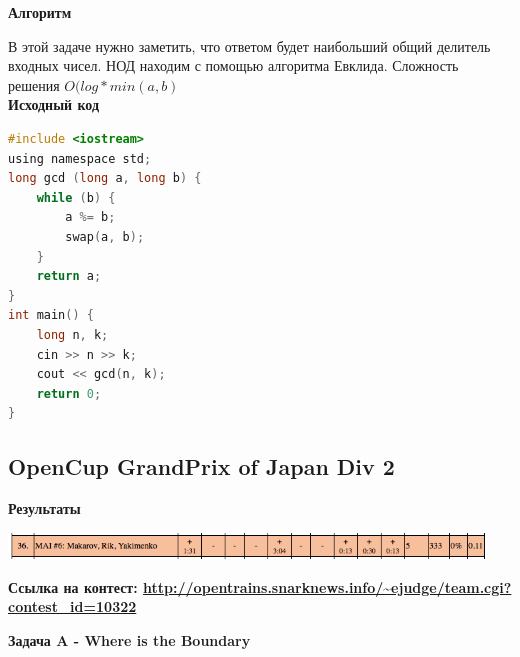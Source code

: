 \documentclass[a4paper,12pt]{article}
\begin{document}
\textbf{{\large Алгоритм}}

В этой задаче нужно заметить, что ответом будет наибольший общий делитель входных чисел. НОД находим с помощью алгоритма Евклида. Сложность решения $O(log * min(a, b)$ \\


\textbf{{\large Исходный код}} \\
\begin{lstlisting}[language=C]
#include <iostream>
using namespace std;
long gcd (long a, long b) {
    while (b) {
        a %= b;
        swap(a, b);
    }
    return a;
}
int main() {
    long n, k;
    cin >> n >> k;
    cout << gcd(n, k);
    return 0;
}
\end{lstlisting}






%
%
\newpage
\subsection{OpenCup GrandPrix of Japan Div 2}

\textbf{{\large Результаты}} \\
\begin{center}
\includegraphics[width=0.95\textwidth]{OC_Japan/result.png}\\ [1cm]
\end{center}

\textbf{{\large Ссылка на контест: \url{http://opentrains.snarknews.info/~ejudge/team.cgi?contest_id=10322}}}


\newpage
\textbf{{\large Задача A - Where is the Boundary}} \\
\end{document}
